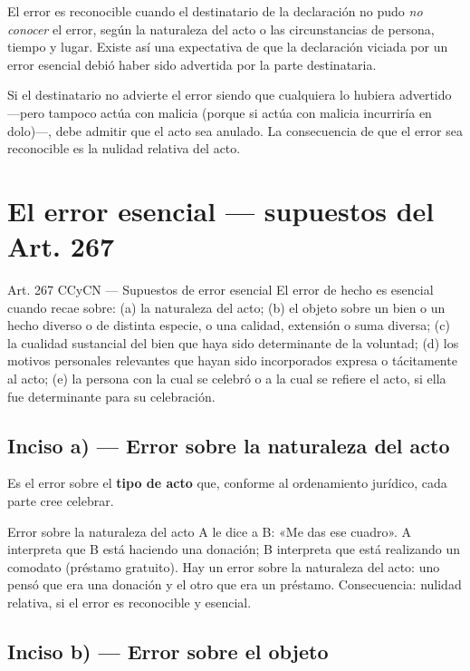 \documentclass[12pt,oneside]{book}
\begin{document}
El error es reconocible cuando el destinatario de la declaración no pudo \textit{no conocer} el error, según la naturaleza del acto o las circunstancias de persona, tiempo y lugar. Existe así una expectativa de que la declaración viciada por un error esencial debió haber sido advertida por la parte destinataria.

Si el destinatario no advierte el error siendo que cualquiera lo hubiera advertido ---pero tampoco actúa con malicia (porque si actúa con malicia incurriría en dolo)---, debe admitir que el acto sea anulado. La consecuencia de que el error sea reconocible es la nulidad relativa del acto.

\section{El error esencial --- supuestos del Art. 267}

\begin{articulo}{Art. 267 CCyCN --- Supuestos de error esencial}
El error de hecho es esencial cuando recae sobre: (a) la naturaleza del acto; (b) el objeto sobre un bien o un hecho diverso o de distinta especie, o una calidad, extensión o suma diversa; (c) la cualidad sustancial del bien que haya sido determinante de la voluntad; (d) los motivos personales relevantes que hayan sido incorporados expresa o tácitamente al acto; (e) la persona con la cual se celebró o a la cual se refiere el acto, si ella fue determinante para su celebración.
\end{articulo}

\subsection{Inciso a) --- Error sobre la naturaleza del acto}

Es el error sobre el \textbf{tipo de acto} que, conforme al ordenamiento jurídico, cada parte cree celebrar.

\begin{example}{Error sobre la naturaleza del acto}
A le dice a B: «Me das ese cuadro». A interpreta que B está haciendo una donación; B interpreta que está realizando un comodato (préstamo gratuito). Hay un error sobre la naturaleza del acto: uno pensó que era una donación y el otro que era un préstamo. Consecuencia: nulidad relativa, si el error es reconocible y esencial.
\end{example}

\subsection{Inciso b) --- Error sobre el objeto}
\end{document}
